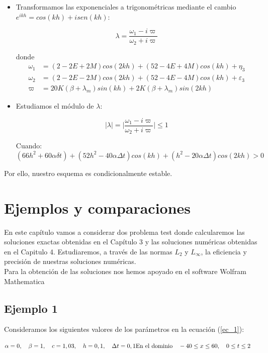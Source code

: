 \begin{itemize}
    \item Transformamos las exponenciales a trigonométricas mediante el cambio $e^{ikh}=cos(kh)+isen(kh)$:
    
    $$\lambda=\frac{\omega_{1}-i\varpi}{\omega_{2}+i\varpi}$$
    
    donde 
    \begin{align*}
        \omega_{1}&=(2-2E+2M)cos(2kh)+(52-4E+4M)cos(kh)+\eta_{3}\\
        \omega_{2}&=(2-2E-2M)cos(2kh)+(52-4E-4M)cos(kh)+\varepsilon_{3}\\
        \varpi& =20K(\beta + \lambda_{m})sin(kh)+2K(\beta + \lambda_{m})sin(2kh)
    \end{align*}
    \item Estudiamos el módulo de $\lambda$:
    
    $$|\lambda |=\Bigg|\frac{\omega_{1}-i\varpi}{\omega_{2}+i\varpi}\Bigg|\leq 1$$
    
    Cuando:
    $${(66h^{2}+60\alpha\delta t)+(52h^{2}-40\alpha\Delta t)cos(kh)+(h^{2}-20\alpha\Delta t)cos(2kh)}>0$$
\end{itemize}

Por ello, nuestro esquema es condicionalmente estable.

\chapter{Ejemplos y comparaciones}

En este capítulo vamos a considerar dos problema test donde calcularemos las soluciones exactas obtenidas en el Capítulo 3 y las soluciones numéricas obtenidas en el Capitulo 4. Estudiaremos, a través de las normas $L_{2}$ y $L_{\infty}$, la eficiencia y precisión de nuestras soluciones numéricas.\\

Para la obtención de las soluciones nos hemos apoyado en el software Wolfram Mathematica

\section{Ejemplo 1}

Consideramos los siguientes valores de los parámetros en la ecuación (\ref{ec_1}):

\begin{equation}
\label{datosej}
    \alpha=0 , \quad \beta=1 , \quad c=1,03 ,\quad h=0,1 ,\quad \Delta t=0,1\\
    
    \mbox{En el dominio}\quad -40 \leq x \leq 60  , \quad 0\leq t \leq 2 \quad
\end{equation}


